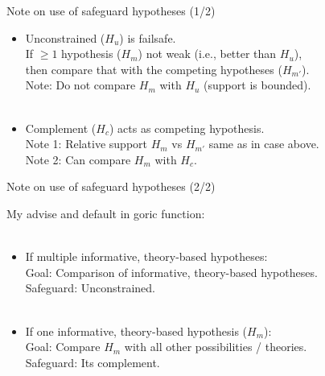 \documentclass[10pt]{beamer}\usepackage[]{graphicx}\usepackage[]{xcolor}
\begin{document}
\begin{frame}{Note on use of safeguard hypotheses (1/2)}

\begin{itemize}
		\item Unconstrained ($H_u$) is failsafe.\\
		If $\geq 1$ hypothesis ($H_m$) not weak (i.e., better than $H_u$),\\
		then compare that with the competing hypotheses ($H_{m'}$).\\
		Note: Do not compare $H_m$ with $H_u$ (support is bounded).\\
		~\\
		\item Complement ($H_c$) acts as competing hypothesis.\\
		Note 1: Relative support $H_m$ vs $H_{m'}$ same as in case above.\\
		Note 2: Can compare $H_m$ with $H_c$.
	\end{itemize}
	

\end{frame}	


\begin{frame}{Note on use of safeguard hypotheses (2/2)}
	
	My advise and default in goric function:\\
	~\\
	\begin{itemize}
		\item If multiple informative, theory-based hypotheses: \\
		Goal: Comparison of informative, theory-based hypotheses.\\
		Safeguard: Unconstrained.\\
		~\\
		\item If one informative, theory-based hypothesis ($H_m$): \\
		Goal: Compare $H_m$ with all other possibilities / theories.\\
		Safeguard: Its complement.
	\end{itemize}
	
\end{frame}	
%
\end{document}
